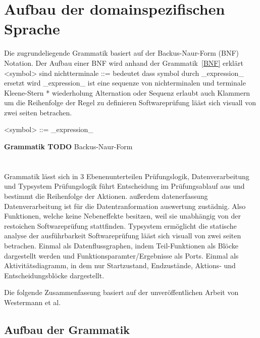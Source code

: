 \documentclass{article}
\begin{document}
    \section{Aufbau der domainspezifischen Sprache}
    Die zugrundeliegende Grammatik basiert auf der Backus-Naur-Form (BNF) Notation. Der Aufbau einer BNF wird anhand der Grammatik~\ref{BNF} erklärt
    <symbol> sind nichtterminale
    ::= bedeutet dass symbol durch _expression_ ersetzt wird
    _expression_ ist eine sequenze von nichterminalen und terminale
    Kleene-Stern * wiederholung
    Alternation \textbar  oder
    Sequenz erlaubt auch Klammern um die Reihenfolge der Regel zu definieren
    Softwareprüfung lääst sich visuall von zwei seiten betrachen. 
    \begin{grammar}
        <symbol> ::= _expression_
    \end{grammar}
    \textbf{Grammatik TODO} Backus-Naur-Form\\\\\\
    \label{BNF}
    Grammatik lässt sich in 3 Ebenenunterteilen Prüfungslogik, Datenverarbeitung und Typsystem
    Prüfungslogik führt Entscheidung im Prüfungsablauf aus und bestimmt die Reihenfolge der Aktionen. außerdem datenerfassung
    Datenverarbeitung ist für die Datentranformation auswertung zustädnig. Also Funktionen, welche keine Nebeneffekte besitzen, weil sie unabhängig von der restoichen Softwareprüfung stattfinden.
    Typsystem ermöglicht die statische analyse der ausführbarkeit
    Softwareprüfung lääst sich visuall von zwei seiten betrachen. 
    Einmal als Datenflussgraphen, indem Teil-Funktionen als Blöcke dargestellt werden und Funktionsparamter/Ergebnisse als Ports.
    Einmal als Aktivitätsdiagramm, in dem nur Startzustand, Endzustände, Aktions- und Entscheidungsblöcke dargestellt.

    Die folgende Zusammenfassung basiert auf der unveröffentlichen Arbeit von Westermann et al.
    \subsection{Aufbau der Grammatik}
\end{document}
